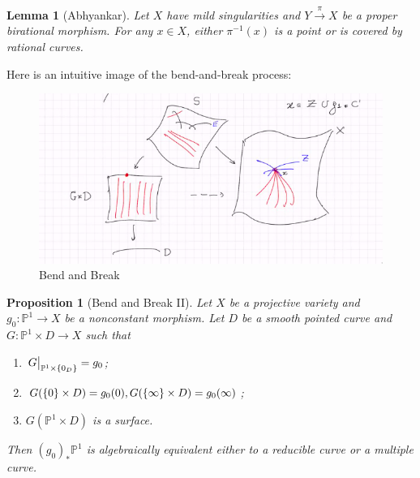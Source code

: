 \documentclass[leqno, openany]{memoir}
\newtheorem{prop}[thm]{Proposition}
\newtheorem{lem}[thm]{Lemma}
\theoremstyle{definition}
\theoremstyle{remark}
\theoremstyle{plain}
\theoremstyle{definition}
\theoremstyle{remark}
\renewcommand{\P}{\mathbb{P}}
\begin{document}
\begin{lem}[Abhyankar]
    Let $X$ have mild singularities and $Y \xrightarrow{\pi} X$ be a proper birational morphism. For any $x \in X$, either $\pi^{-1}(x)$ is a point or is covered by rational curves.
\end{lem}

Here is an intuitive image of the bend-and-break process:
\begin{figure}[H]
    \centering
    \includegraphics[width=0.8\linewidth]{bendbreak}
    \caption{Bend and Break}%
    \label{fig:bendbreak}
\end{figure}

\begin{prop}[Bend and Break II]
    Let $X$ be a projective variety and $g_0 \colon \P^1 \to X$ be a nonconstant morphism. Let $D$ be a smooth pointed curve and $G \colon \P^1 \times D \to X$ such that
    \begin{enumerate}
        \item $\eval{G}_{\P^1 \times \qty{0_D}} = g_0$;
        \item $G(\qty{0} \times D) = g_0(0), G(\qty{\infty} \times D) = g_0(\infty)$;
        \item $G(\P^1 \times D)$ is a surface.
    \end{enumerate}
    Then ${(g_0)}_* \P^1$ is algebraically equivalent either to a reducible curve or a multiple curve.
\end{prop}
\end{document}
